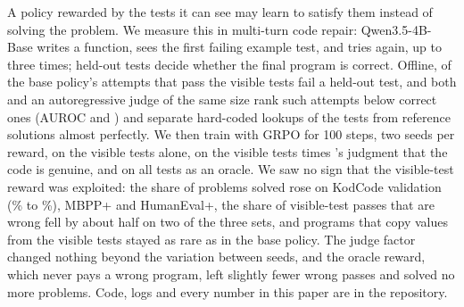 A policy rewarded by the tests it can see may learn to satisfy them instead of solving the problem. We measure this in
multi-turn code repair: Qwen3.5-4B-Base writes a function, sees the first failing example test, and tries again, up
to three times; held-out tests decide whether the final program is correct. Offline,  of the base
policy's attempts that pass the visible tests fail a held-out test, and both \kev{} and an autoregressive judge of the
same size rank such attempts below correct ones (AUROC  and ) and separate
hard-coded lookups of the tests from reference solutions almost perfectly. We then train with GRPO for 100 steps, two
seeds per reward, on the visible tests alone, on the visible tests times \kev{}'s judgment that the code is genuine, and
on all tests as an oracle. We saw no sign that the visible-test reward was exploited: the share of problems solved rose on KodCode
validation (\% to \%), MBPP+ and HumanEval+, the share of visible-test
passes that are wrong fell by about half on two of the three sets, and programs that copy values from the visible
tests stayed as rare as in the base policy. The judge factor changed nothing beyond the variation between seeds, and the
oracle reward, which never pays a wrong program, left slightly fewer wrong passes and solved no more problems. Code, logs and every number in this paper are in the
repository.
